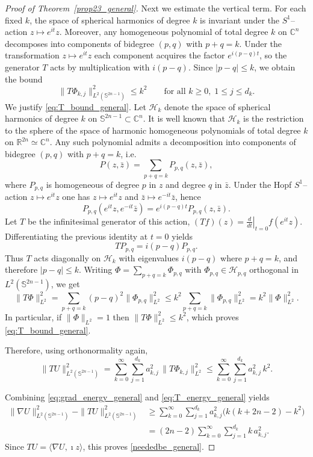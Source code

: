 \documentclass[11pt]{amsart}
\numberwithin{equation}{section}
\def\ge{\geqslant}
\begin{document}
\begin{proof}[Proof of Theorem~\ref{prop23_general}]
Next we estimate the vertical term. For each fixed $k$, the space of spherical
harmonics of degree $k$ is invariant under the $S^1$--action
$z\mapsto e^{it}z$. Moreover, any homogeneous polynomial of total degree $k$
on $\mathbb C^n$ decomposes into components of bidegree $(p,q)$ with $p+q=k$.
Under the transformation $z\mapsto e^{it}z$ each component acquires the factor
$e^{i(p-q)t}$, so the generator $T$ acts by multiplication with $i(p-q)$.
Since $|p-q|\le k$, we obtain the bound
\begin{equation}
\|T\Phi_{k,j}\|_{L^2(\mathbb S^{2n-1})}^2\le k^2
\qquad\text{for all }k\ge 0,\; 1\le j\le d_k.
\label{eq:T_bound_general}
\end{equation}
We justify \eqref{eq:T_bound_general}. Let $\mathcal H_k$ denote the space of
spherical harmonics of degree $k$ on $\mathbb S^{2n-1}\subset\mathbb C^n$.
It is well known that $\mathcal H_k$ is the restriction to the sphere of the
space of harmonic homogeneous polynomials of total degree $k$ on $\mathbb R^{2n}
\simeq \mathbb C^n$. Any such polynomial admits a decomposition into components
of bidegree $(p,q)$ with $p+q=k$, i.e.
\[
P(z,\bar z)=\sum_{p+q=k} P_{p,q}(z,\bar z),
\]
where $P_{p,q}$ is homogeneous of degree $p$ in $z$ and degree $q$ in $\bar z$.
Under the Hopf $S^1$--action $z\mapsto e^{it}z$ one has
$z\mapsto e^{it}z$ and $\bar z\mapsto e^{-it}\bar z$, hence
\[
P_{p,q}(e^{it}z,e^{-it}\bar z)=e^{i(p-q)t}P_{p,q}(z,\bar z).
\]
Let $T$ be the infinitesimal generator of this action,
$(Tf)(z)=\left.\frac{d}{dt}\right|_{t=0} f(e^{it}z)$. Differentiating the
previous identity at $t=0$ yields
\[
T P_{p,q}= i(p-q)P_{p,q}.
\]
Thus $T$ acts diagonally on $\mathcal H_k$ with eigenvalues $i(p-q)$
where $p+q=k$, and therefore $|p-q|\le k$. Writing $\Phi=\sum_{p+q=k}\Phi_{p,q}$
with $\Phi_{p,q}\in \mathcal H_{p,q}$ orthogonal in $L^2(\mathbb S^{2n-1})$, we get
\[
\|T\Phi\|_{L^2}^2
= \sum_{p+q=k} (p-q)^2\|\Phi_{p,q}\|_{L^2}^2
\le k^2\sum_{p+q=k}\|\Phi_{p,q}\|_{L^2}^2
= k^2\|\Phi\|_{L^2}^2.
\]
In particular, if $\|\Phi\|_{L^2}=1$ then $\|T\Phi\|_{L^2}^2\le k^2$, which proves
\eqref{eq:T_bound_general}.

Therefore, using orthonormality again,
\begin{equation}
\|TU\|_{L^2(\mathbb S^{2n-1})}^2
=\sum_{k=0}^\infty\sum_{j=1}^{d_k} a_{k,j}^2\,\|T\Phi_{k,j}\|_{L^2}^2
\le \sum_{k=0}^\infty\sum_{j=1}^{d_k} a_{k,j}^2\,k^2 .
\label{eq:T_energy_general}
\end{equation}

Combining \eqref{eq:grad_energy_general} and \eqref{eq:T_energy_general} yields
\begin{align*}
\|\nabla U\|_{L^2(\mathbb S^{2n-1})}^2-\|TU\|_{L^2(\mathbb S^{2n-1})}^2
&\ge \sum_{k=0}^\infty\sum_{j=1}^{d_k}
a_{k,j}^2\Big(k(k+2n-2)-k^2\Big)\\
&=(2n-2)\sum_{k=0}^\infty\sum_{j=1}^{d_k} k\,a_{k,j}^2.
\end{align*}
Since $TU=\langle \nabla U,\imath z\rangle$, this proves
\eqref{neededbe_general}.


\end{proof}
\end{document}
